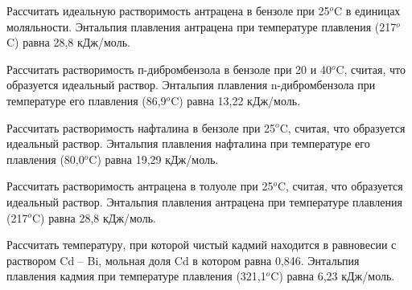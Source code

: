 \begin{Task}
Рассчитать идеальную растворимость антрацена в бензоле при 25$^{o}$C в единицах моляльности. Энтальпия плавления антрацена при температуре плавления (217$^{o}$C) равна 28,8 кДж/моль.
\end{Task}
\begin{Task}
Рассчитать растворимость п-дибромбензола в бензоле при 20 и 40$^{o}$C, считая, что образуется идеальный раствор. Энтальпия плавления n-дибромбензола при температуре его плавления (86,9$^{o}$C) равна 13,22 кДж/моль.
\end{Task}
\begin{Task}
Рассчитать растворимость нафталина в бензоле при 25$^{o}$C, считая, что образуется идеальный раствор. Энтальпия плавления нафталина при температуре его плавления (80,0$^{o}$C) равна 19,29 кДж/моль.
\end{Task}
\begin{Task}
Рассчитать растворимость антрацена в толуоле при 25$^{o}$C, считая, что образуется идеальный раствор. Энтальпия плавления антрацена при температуре плавления (217$^{o}$C) равна 28,8 кДж/моль.
\end{Task}
\begin{Task}
Рассчитать температуру, при которой чистый кадмий находится в равновесии с раствором Cd – Bi, мольная доля Cd в котором равна 0,846. Энтальпия плавления кадмия при температуре плавления (321,1$^{o}$C) равна 6,23 кДж/моль.
\end{Task}